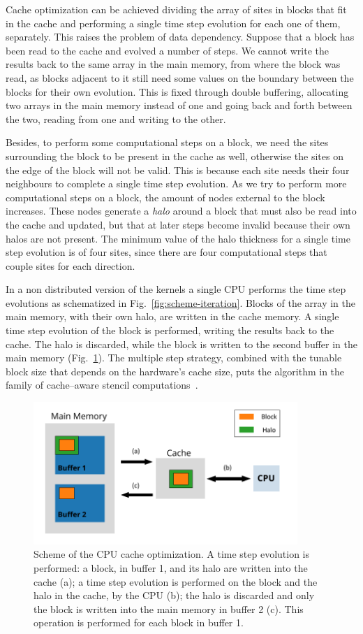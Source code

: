 Cache optimization can be achieved dividing the array of sites in blocks that fit in the cache and performing a single time step evolution for each one of them, separately. This raises the problem of data dependency. Suppose that a block has been read to the cache and evolved a number of steps. We cannot write the results back to the same array in the main memory, from where the block was read, as blocks adjacent to it still need some values on the boundary between the blocks for their own evolution. This is fixed through double buffering, allocating two arrays in the main memory instead of one and going back and forth between the two, reading from one and writing to the other.

Besides, to perform some computational steps on a block, we need the sites surrounding the block to be present in the cache as well, otherwise the sites on the edge of the block will not be valid. This is because each site needs their four neighbours to complete a single time step evolution. As we try to perform more computational steps on a block, the amount of nodes external to the block increases. These nodes generate a \textit{halo} around a block that must also be read into the cache and updated, but that at later steps become invalid because their own halos are not present. The minimum value of the halo thickness for a single time step evolution is of four sites, since there are four computational steps that couple sites for each direction.

In a non distributed version of the kernels a single CPU performs the time step evolutions as schematized in Fig.~\ref{fig:scheme-iteration}. Blocks of the array in the main memory, with their own halo, are written in the cache memory. A single time step evolution of the block is performed, writing the results back to the cache. The halo is discarded, while the block is written to the second buffer in the main memory (Fig.~\ref{fig:CPU-cache-optimization}). The multiple step strategy, combined with the tunable block size that depends on the hardware's cache size, puts the algorithm in the family of cache--aware stencil computations~\cite{kamil2006implicit}.
\begin{figure}
   \centering
   \includegraphics[width=10cm]{Figs/CPU-cache-optimization.pdf}
   \caption{Scheme of the CPU cache optimization. A time step evolution is performed: a block, in buffer 1, and its halo are written into the cache (a); a time step evolution is performed on the block and the halo in the cache, by the CPU (b); the halo is discarded and only the block is written into the main memory in buffer 2 (c). This operation is performed for each block in buffer 1.} \label{fig:CPU-cache-optimization}
\end{figure}

